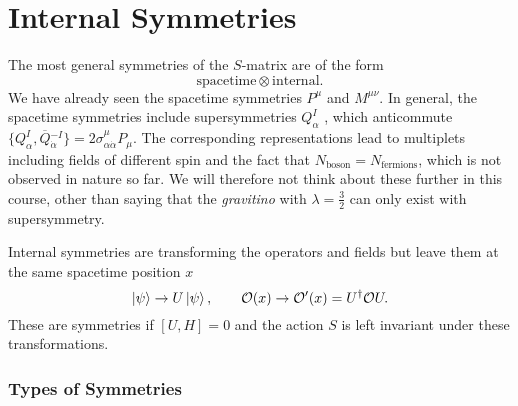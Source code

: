 
\chapter{Internal Symmetries}%
\label{cha:internal_symmetries}

The most general symmetries of the $S$-matrix are of the form
\begin{equation}
  \text{spacetime} \otimes \text{internal}.
\end{equation}
We have already seen the spacetime symmetries $P^{\mu}$ and $M^{\mu\nu}$.
In general, the spacetime symmetries include supersymmetries $Q_{\alpha}^I$ , which anticommute $\{Q_{\alpha}^I, \overline{Q}{}_{\dot{\alpha}}^{-I}\} = 2 \sigma^{\mu}_{\alpha \dot{\alpha}} P_{\mu}$. The corresponding representations lead to multiplets including fields of different spin and the fact that $N_{\text{boson}} = N_{\text{fermions}}$, which is not observed in nature so far. We will therefore not think about these further in this course, other than saying that the \emph{gravitino} with $\lambda = \frac{3}{2}$  can only exist with supersymmetry.

Internal symmetries are transforming the operators and fields but leave them at the same spacetime position $x$
\begin{equation}
  \ket{\psi} \to U \ket{\psi}, \qquad \mathcal{O}(x) \to \mathcal{O}'(x) = U^{\dagger} \mathcal{O} U.
\end{equation}
These are symmetries if $[U, H] = 0$ and the action $S$  is left invariant under these transformations.

\subsection{Types of Symmetries}%
\label{sub:types_of_symmetries}


